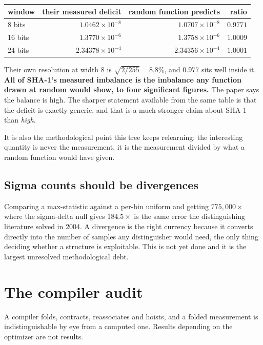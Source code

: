 \begin{center}
\begin{tabular}{@{}lrrr@{}}
\toprule
window & their measured deficit & random function predicts & ratio \\
\midrule
8 bits & \(1.0462 \times 10^{-8}\) & \(1.0707 \times 10^{-8}\) & \(0.9771\) \\
16 bits & \(1.3770 \times 10^{-6}\) & \(1.3758 \times 10^{-6}\) & \(1.0009\) \\
24 bits & \(2.34378 \times 10^{-4}\) & \(2.34356 \times 10^{-4}\) & \(1.0001\) \\
\bottomrule
\end{tabular}
\end{center}

Their own resolution at width 8 is \(\sqrt{2/255} = 8.8\%\), and \(0.977\) sits well inside it. \textbf{All of SHA-1's measured imbalance is the imbalance any function drawn at random would show, to four significant figures.} The paper says the balance is high. The sharper statement available from the same table is that the deficit is exactly generic, and that is a much stronger claim about SHA-1 than \emph{high}.

It is also the methodological point this tree keeps relearning: the interesting quantity is never the measurement, it is the measurement divided by what a random function would have given.

\subsection{Sigma counts should be divergences}

Comparing a max-statistic against a per-bin uniform and getting \(775{,}000\times\) where the sigma-delta null gives \(184.5\times\) is the same error the distinguishing literature solved in 2004. A divergence is the right currency because it converts directly into the number of samples any distinguisher would need, the only thing deciding whether a structure is exploitable. This is not yet done and it is the largest unresolved methodological debt.

\section{The compiler audit}

A compiler folds, contracts, reassociates and hoists, and a folded measurement is indistinguishable by eye from a computed one. Results depending on the optimizer are not results.

